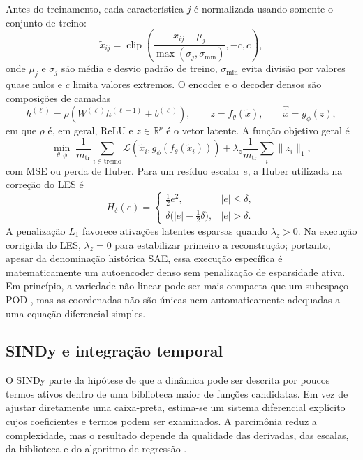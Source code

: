 \documentclass[12pt,a4paper]{article}
\begin{document}
Antes do treinamento, cada característica $j$ é normalizada usando somente o conjunto de treino:
\begin{equation}
\widetilde{x}_{ij}=
\operatorname{clip}\!\left(
\frac{x_{ij}-\mu_j}{\max(\sigma_j,\sigma_{\min})},-c,c
\right),
\label{eq:normalizacao_sae}
\end{equation}
onde $\mu_j$ e $\sigma_j$ são média e desvio padrão de treino, $\sigma_{\min}$ evita divisão por valores quase nulos e $c$ limita valores extremos. O encoder e o decoder densos são composições de camadas
\begin{equation}
h^{(\ell)}=\rho\!\left(W^{(\ell)}h^{(\ell-1)}+b^{(\ell)}\right),
\qquad
z=f_{\theta}(\widetilde x),
\qquad
\widehat{\widetilde x}=g_{\phi}(z),
\label{eq:sae_rede}
\end{equation}
em que $\rho$ é, em geral, ReLU e $z\in\mathbb{R}^{p}$ é o vetor latente. A função objetivo geral é
\begin{equation}
\min_{\theta,\phi}\;
\frac{1}{m_{\mathrm{tr}}}\sum_{i\in\mathrm{treino}}
\mathcal{L}\!\left(\widetilde x_i,g_\phi(f_\theta(\widetilde x_i))\right)
+\lambda_z\frac{1}{m_{\mathrm{tr}}}\sum_i\lVert z_i\rVert_1,
\label{eq:sae_objetivo}
\end{equation}
com MSE ou perda de Huber. Para um resíduo escalar $e$, a Huber utilizada na correção do LES é
\begin{equation}
H_\delta(e)=
\begin{cases}
\tfrac12e^2,&|e|\leq\delta,\\
\delta\bigl(|e|-\tfrac12\delta\bigr),&|e|>\delta.
\end{cases}
\label{eq:huber}
\end{equation}
A penalização $L_1$ favorece ativações latentes esparsas quando $\lambda_z>0$. Na execução corrigida do LES, $\lambda_z=0$ para estabilizar primeiro a reconstrução; portanto, apesar da denominação histórica SAE, essa execução específica é matematicamente um autoencoder denso sem penalização de esparsidade ativa. Em princípio, a variedade não linear pode ser mais compacta que um subespaço POD \cite{hinton2006}, mas as coordenadas não são únicas nem automaticamente adequadas a uma equação diferencial simples.

\subsection{SINDy e integração temporal}
O SINDy parte da hipótese de que a dinâmica pode ser descrita por poucos termos ativos dentro de uma biblioteca maior de funções candidatas. Em vez de ajustar diretamente uma caixa-preta, estima-se um sistema diferencial explícito cujos coeficientes e termos podem ser examinados. A parcimônia reduz a complexidade, mas o resultado depende da qualidade das derivadas, das escalas, da biblioteca e do algoritmo de regressão \cite{brunton2016,kaptanoglu2022}.
\end{document}
